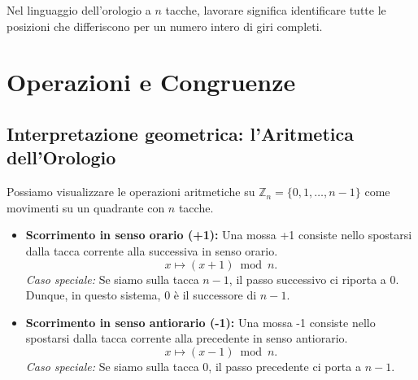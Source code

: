Nel linguaggio dell'orologio a \(n\) tacche, lavorare  significa identificare tutte le posizioni che differiscono per un numero intero di giri completi.


\begin{center}
\end{center}


























\section{Operazioni  e Congruenze}

\subsection*{Interpretazione geometrica: l'Aritmetica dell'Orologio}

Possiamo visualizzare le operazioni aritmetiche su \(\mathbb{Z}_n = \{0, 1, \dots, n-1\}\) come movimenti su un quadrante con \(n\) tacche.

\begin{itemize}
    \item \textbf{Scorrimento in senso orario (+1):}
    Una mossa +1 consiste nello spostarsi dalla tacca corrente alla successiva in senso orario. 
    \[
    x \mapsto (x + 1) \bmod n.
    \]
    \emph{Caso speciale:} Se siamo sulla tacca \(n-1\), il passo successivo ci riporta a 0. Dunque, in questo sistema, 0 è il successore di \(n-1\).

    \item \textbf{Scorrimento in senso antiorario (-1):}
    Una mossa -1 consiste nello spostarsi dalla tacca corrente alla precedente in senso antiorario.
    \[
    x \mapsto (x - 1) \bmod n.
    \]
    \emph{Caso speciale:} Se siamo sulla tacca 0, il passo precedente ci porta a \(n-1\).
\end{itemize}

